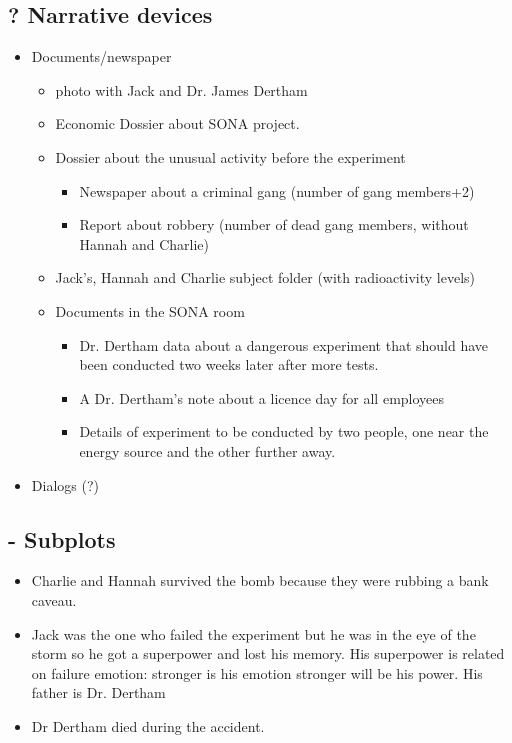\subsection{? Narrative devices}
\begin{itemize}  
\item Documents/newspaper
\begin{itemize}
\item photo with Jack and Dr. James Dertham
\item Economic Dossier about SONA project.
\item Dossier about the unusual activity before the experiment
\begin{itemize}  
\item Newspaper about a criminal gang (number of gang members+2)
\item Report about robbery (number of dead gang members, without Hannah and Charlie)
\end{itemize}
\item Jack’s, Hannah and Charlie subject folder (with radioactivity levels)
\item Documents in the SONA room
\begin{itemize}  
\item Dr. Dertham data about a dangerous experiment that should have been conducted two weeks later after more tests.
\item A Dr. Dertham’s note about a licence day for all employees 
\item Details of experiment to be conducted by two people, one near the energy source and the other further away.
\end{itemize}
\end{itemize}
\item Dialogs (?)
\end{itemize}

\subsection{- Subplots}
\begin{itemize}  
\item Charlie and Hannah survived the bomb because they were rubbing a bank caveau. 
\item Jack was the one who failed the experiment but he was in the eye of the storm so he got a superpower and lost his memory. His superpower is related on failure emotion: stronger is his emotion stronger will be his power. His father is Dr. Dertham
\item Dr Dertham died during the accident. 
\end{itemize} 

